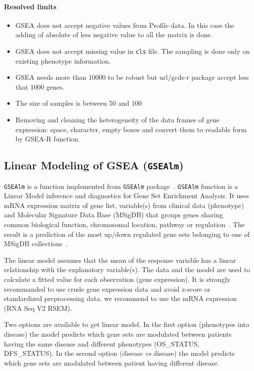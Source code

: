 \documentclass[a4paper]{article}
\begin{document}
\paragraph{Resolved limits}
\begin{itemize}
    \item GSEA does not accept negative values from Profile data. In this case the adding of absolute of less negative value to all the matrix is done.
    \item GSEA does not accept missing value in \texttt{cls} file. The sampling is done only on existing phenotype information.
    \item GSEA needs more than 10000 to be robust but url/gcds-r package accept less that 1000 genes.
    \item The size of samples is between 50 and 100
    \item Removing and cleaning the heterogeneity of the data frames of gene expression: space, character, empty boxes and convert them to readable form by GSEA-R function.
\end{itemize}


\subsection{Linear Modeling of GSEA (\texttt{GSEAlm})}
        \texttt{GSEAlm} is a function implemented from \texttt{GSEAlm} package~\cite{Oron2008}. \texttt{GSEAlm} function is a Linear Model inference and diagnostics for Gene Set Enrichment Analysis. It uses mRNA expression matrix of gene list, variable(s) from clinical data (phenotype) and Molecular Signature Data Base (MSigDB) that groups genes sharing common biological function, chromosomal location,  pathway or regulation~\cite{Subramanian2005}.  The result is a prediction of the most up/down regulated gene sets belonging to one of MSigDB collections~\cite{Subramanian2005, Liberzon2011}.

The linear model assumes that the mean of the response variable has a linear relationship with the explanatory variable(s). The data and the model are used to calculate a fitted value for each observation (gene expression). It is strongly recommanded to use crude gene expression data and avoid z-score or standardized preprocessing data. we recommend to use the mRNA expression (RNA Seq V2 RSEM).

Two options are available to get linear model. In the first option (phenotypes into disease) the model predicts which gene sets are modulated between patients having the same disease and different phenotypes (OS\_STATUS, DFS\_STATUS). In the second option (disease \emph{vs} disease) the model predicts which gene sets are modulated between patient having different disease.
\end{document}
